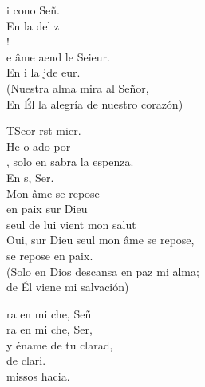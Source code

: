 \documentclass[12pt]{article}
\begin{document}
\begin{multicols*}{2}
\begin{cancion}%
	i cono Señ.  \\
	En  la del z\\
	!   \\
\jump
	e âme aend le Seieur.\\
	En i la jde eur.\\
(Nuestra alma mira al Señor,\\
En Él la alegría de nuestro corazón)\\
\end{cancion}%

\begin{cancion}%
	TSeor rst mier.\\
	He o ado por \\
	, solo en sabra la espenza. \\
	En s, Ser.\\
Mon âme se repose\\
en paix sur Dieu \\
seul de lui vient mon salut\\
Oui, sur Dieu seul mon âme se repose,\\
se repose en paix.\\
(Solo en Dios descansa en paz mi alma;\\
de Él viene mi salvación)\\
\end{cancion}%

\begin{cancion}%
	ra en mi che, Señ \\
	ra en mi che, Ser,\\
	y éname de tu clarad, \\
	de clari.\\
	missos hacia.\\
\end{cancion}%


\end{multicols*}
\end{document}
